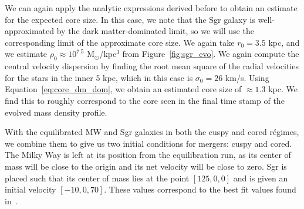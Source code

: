 We can again apply the analytic expressions derived before to obtain an
estimate for the expected core size.  In this case, we note that the Sgr
galaxy is well-approximated by the dark matter-dominated limit, so we will use
the corresponding limit of the approximate core size.  We again take $r_0 =
3.5$ kpc, and we estimate $\rho_0 \approx 10^{7.5}$ M$_\odot$/kpc$^3$ from
Figure~\ref{fig:sgr_evo}.  We again compute the central velocity dispersion by
finding the root mean square of the radial velocities for the stars in the
inner 5 kpc, which in this case is $\sigma_0 = 26$ km/s.  Using
Equation~\ref{eq:core_dm_dom}, we obtain an estimated core size of $\approx
1.3$ kpc.  We find this to roughly correspond to the core seen in the final
time stamp of the evolved mass density profile.

With the equilibrated MW and Sgr galaxies in both the cuspy and cored régimes,
we combine them to give us two initial conditions for mergers: cuspy and
cored. The Milky Way is left at its position from the equilibration run, as
its center of mass will be close to the origin and its net velocity will be
close to zero. Sgr is placed such that its center of mass lies at the point
\([125, 0, 0]\) and is given an initial velocity \([-10,0,70]\).  These values
correspond to the best fit values found in~\cite{dierickx_predicted_2017}.
